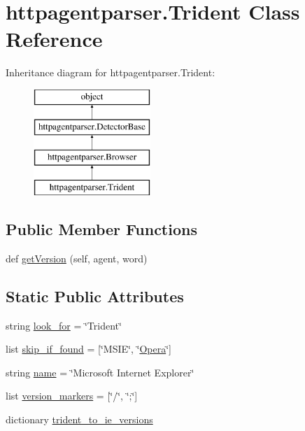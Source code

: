 \hypertarget{classhttpagentparser_1_1_trident}{}\section{httpagentparser.\+Trident Class Reference}
\label{classhttpagentparser_1_1_trident}
Inheritance diagram for httpagentparser.\+Trident\+:\begin{figure}[H]
\begin{center}
\leavevmode
\includegraphics[height=4.000000cm]{classhttpagentparser_1_1_trident}
\end{center}
\end{figure}
\subsection*{Public Member Functions}
\begin{DoxyCompactItemize}
\item 
def \hyperlink{classhttpagentparser_1_1_trident_a6ff39e555868bd4b20fb42f7ceaac274}{get\+Version} (self, agent, word)
\end{DoxyCompactItemize}
\subsection*{Static Public Attributes}
\begin{DoxyCompactItemize}
\item 
string \hyperlink{classhttpagentparser_1_1_trident_a54ad9658e6723b62803de10a1f00927d}{look\+\_\+for} = \char`\"{}Trident\char`\"{}
\item 
list \hyperlink{classhttpagentparser_1_1_trident_acc5542d3a8f58269c88f2c1c2126e35a}{skip\+\_\+if\+\_\+found} = \mbox{[}\char`\"{}M\+S\+IE\char`\"{}, \char`\"{}\hyperlink{classhttpagentparser_1_1_opera}{Opera}\char`\"{}\mbox{]}
\item 
string \hyperlink{classhttpagentparser_1_1_trident_a66855e9e222c4780c973d4d0e253b25e}{name} = \char`\"{}Microsoft Internet Explorer\char`\"{}
\item 
list \hyperlink{classhttpagentparser_1_1_trident_a4461af8f9aee48d3001f40fc2ab62cae}{version\+\_\+markers} = \mbox{[}\char`\"{}/\char`\"{}, \char`\"{};\char`\"{}\mbox{]}
\item 
dictionary \hyperlink{classhttpagentparser_1_1_trident_a78dabcc84152bb6bd24bec45cd0f8f8e}{trident\+\_\+to\+\_\+ie\+\_\+versions}
\end{DoxyCompactItemize}
